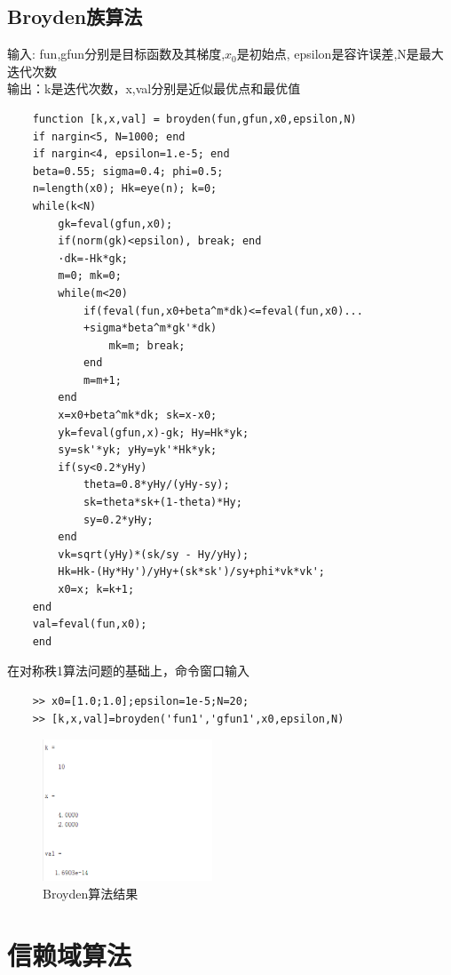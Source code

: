 \documentclass[12pt]{article} %
\begin{document}
	\subsection{Broyden族算法}
	\indent 输入: fun,gfun分别是目标函数及其梯度,$x_0$是初始点,
epsilon是容许误差,N是最大迭代次数\\
	\indent 输出：k是迭代次数，x,val分别是近似最优点和最优值
	\begin{lstlisting}
	function [k,x,val] = broyden(fun,gfun,x0,epsilon,N)
	if nargin<5, N=1000; end
	if nargin<4, epsilon=1.e-5; end
	beta=0.55; sigma=0.4; phi=0.5;
	n=length(x0); Hk=eye(n); k=0;
	while(k<N)
		gk=feval(gfun,x0);
		if(norm(gk)<epsilon), break; end
		·dk=-Hk*gk;
		m=0; mk=0;
		while(m<20)
			if(feval(fun,x0+beta^m*dk)<=feval(fun,x0)...
			+sigma*beta^m*gk'*dk)
				mk=m; break;
			end
			m=m+1;
		end
		x=x0+beta^mk*dk; sk=x-x0;
		yk=feval(gfun,x)-gk; Hy=Hk*yk;
		sy=sk'*yk; yHy=yk'*Hk*yk;
		if(sy<0.2*yHy)
			theta=0.8*yHy/(yHy-sy);
			sk=theta*sk+(1-theta)*Hy;
			sy=0.2*yHy;
		end
		vk=sqrt(yHy)*(sk/sy - Hy/yHy);
		Hk=Hk-(Hy*Hy')/yHy+(sk*sk')/sy+phi*vk*vk';
		x0=x; k=k+1;
	end
	val=feval(fun,x0);
	end
	\end{lstlisting}
	\indent 在对称秩1算法问题的基础上，命令窗口输入
	\begin{lstlisting}
	>> x0=[1.0;1.0];epsilon=1e-5;N=20;
	>> [k,x,val]=broyden('fun1','gfun1',x0,epsilon,N)
	\end{lstlisting}
	\begin{figure}[ht]
	\centering
	\includegraphics[width=0.45\textwidth]{broyden.png}
	\caption{Broyden算法结果}
	\label{fig:fig1}
	\end{figure}
	\section{信赖域算法}
\end{document}
